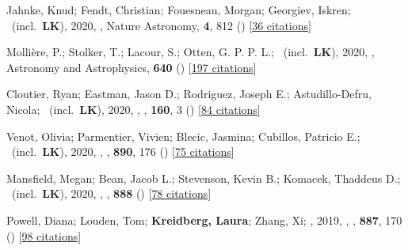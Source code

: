 \item[{\color{numcolor}\scriptsize37}] Jahnke, Knud; Fendt, Christian; Fouesneau, Morgan; Georgiev, Iskren; \etal\ (incl.\ \textbf{LK}), 2020, , Nature Astronomy, \textbf{4}, 812 () [\href{https://ui.adsabs.harvard.edu/abs/2020NatAs...4..812J}{36 citations}]

\item[{\color{numcolor}\scriptsize36}] Molli{\`e}re, P.; Stolker, T.; Lacour, S.; Otten, G. P. P. L.; \etal\ (incl.\ \textbf{LK}), 2020, , Astronomy and Astrophysics, \textbf{640} () [\href{https://ui.adsabs.harvard.edu/abs/2020A&A...640A.131M}{197 citations}]

\item[{\color{numcolor}\scriptsize35}] Cloutier, Ryan; Eastman, Jason D.; Rodriguez, Joseph E.; Astudillo-Defru, Nicola; \etal\ (incl.\ \textbf{LK}), 2020, , \aj, \textbf{160}, 3 () [\href{https://ui.adsabs.harvard.edu/abs/2020AJ....160....3C}{84 citations}]

\item[{\color{numcolor}\scriptsize34}] Venot, Olivia; Parmentier, Vivien; Blecic, Jasmina; Cubillos, Patricio E.; \etal\ (incl.\ \textbf{LK}), 2020, , \apj, \textbf{890}, 176 () [\href{https://ui.adsabs.harvard.edu/abs/2020ApJ...890..176V}{75 citations}]

\item[{\color{numcolor}\scriptsize33}] Mansfield, Megan; Bean, Jacob L.; Stevenson, Kevin B.; Komacek, Thaddeus D.; \etal\ (incl.\ \textbf{LK}), 2020, , \apj, \textbf{888} () [\href{https://ui.adsabs.harvard.edu/abs/2020ApJ...888L..15M}{78 citations}]

\item[{\color{numcolor}\scriptsize32}] Powell, Diana; Louden, Tom; \textbf{Kreidberg, Laura}; Zhang, Xi; \etal, 2019, , \apj, \textbf{887}, 170 () [\href{https://ui.adsabs.harvard.edu/abs/2019ApJ...887..170P}{98 citations}]

